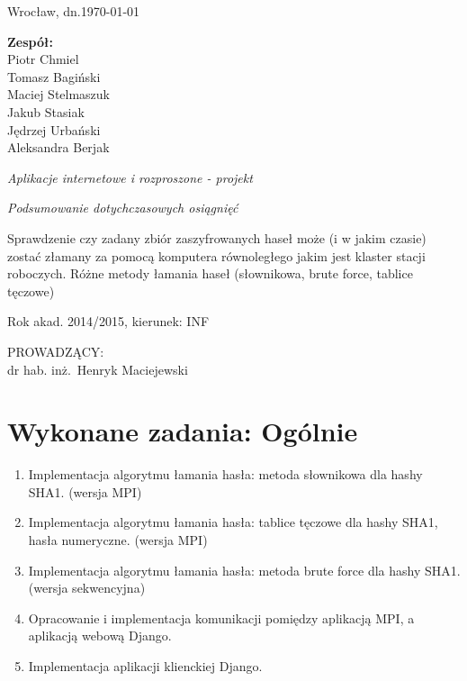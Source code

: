 \documentclass[a4paper,10pt]{article}
\begin{document}
\thispagestyle{empty}


\hfill Wrocław, dn.\today\\
\begin{minipage}[c]{0.4\columnwidth}
  \textbf{Zespół:}\\
  Piotr Chmiel\\
  Tomasz Bagiński\\
  Maciej Stelmaszuk\\
  Jakub Stasiak\\
  Jędrzej Urbański\\
  Aleksandra Berjak\\
  
\end{minipage}
\hfill
\vspace{2.5cm}
\begin{center}
  \begin{LARGE}
    \emph{ Aplikacje internetowe i rozproszone - projekt} \\
  \end{LARGE}
  \begin{Large}
    \emph{Podsumowanie dotychczasowych osiągnięć} \\
  \end{Large}
  \vspace{1.0cm}
    Sprawdzenie czy zadany zbiór zaszyfrowanych haseł może (i w jakim czasie) zostać złamany za pomocą komputera równoległego jakim jest klaster stacji roboczych. Różne metody łamania haseł (słownikowa, brute force, tablice tęczowe)
\end{center}

\begin{center}
  Rok akad. 2014/2015, kierunek: INF
\end{center}
\vspace{1.2cm}
\begin{flushright}
\begin{minipage}[t]{0.4\columnwidth}
\noindent
PROWADZĄCY:\\
dr hab. inż.~Henryk Maciejewski
\end{minipage}
\end{flushright}
\vfill
\newpage
\tableofcontents{}
\section{Wykonane zadania: Ogólnie}

\begin{enumerate}
	\item Implementacja algorytmu łamania hasła: metoda słownikowa dla hashy SHA1. (wersja MPI)
	\item Implementacja algorytmu łamania hasła: tablice tęczowe dla hashy SHA1, hasła numeryczne. (wersja MPI)
	\item Implementacja algorytmu łamania hasła: metoda brute force dla hashy SHA1. (wersja sekwencyjna)
	\item Opracowanie i implementacja komunikacji pomiędzy aplikacją MPI, a aplikacją webową Django.
	\item Implementacja aplikacji klienckiej Django.
	
\end{enumerate}
\end{document}

